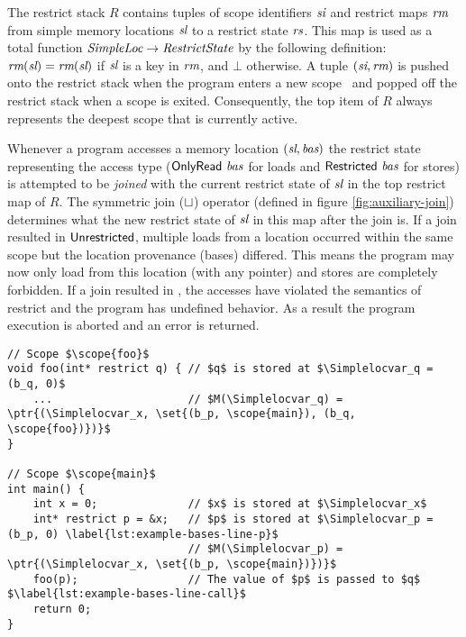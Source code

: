The restrict stack $R$ contains tuples of scope identifiers $\textit{si}$ and restrict maps $\textit{rm}$ from simple memory locations $\textit{sl}$ to 
a restrict state $\textit{rs}$.
This map is used as a total function $\textit{SimpleLoc}\rightarrow \textit{RestrictState}$ by the following definition: 
$\textit{rm}(\textit{sl}) = \textit{rm}(\textit{sl})$ if $\textit{sl}$ is a key in $\textit{rm}$, and $\bot$ otherwise.
A tuple $(\textit{si}, \textit{rm})$ is pushed onto the restrict stack when the program enters a new scope \Scopeidvar \ and
popped off the restrict stack when a scope is exited.
Consequently, the top item of $R$ always represents the deepest scope that is currently active.

Whenever a program accesses a memory location $(\textit{sl}, \textit{bas})$
the restrict state representing the access type ($\mathsf{OnlyRead} \ \textit{bas}$ for loads and $\mathsf{Restricted} \ \textit{bas}$ for stores)
is attempted to be \textit{joined} with the current restrict state of $\textit{sl}$ in the top restrict map of $R$.
The symmetric join ($\mathrel{\sqcup}$) operator (defined in figure \ref{fig:auxiliary-join}) determines what the new restrict state of $\textit{sl}$ in this map after the join is.
If a join resulted in $\mathsf{Unrestricted}$, multiple loads from a location occurred within the same scope but the location provenance (\ie bases) differed.
This means the program may now only load from this location (with any pointer) and stores are completely forbidden.
If a join resulted in \rsub, the accesses have violated the semantics of restrict and the program has undefined behavior.
As a result the program execution is aborted and an error is returned.

\newpage

\begin{code}
\begin{verbatim}
// Scope $\scope{foo}$
void foo(int* restrict q) { // $q$ is stored at $\Simplelocvar_q = (b_q, 0)$
    ...                     // $M(\Simplelocvar_q) = \ptr{(\Simplelocvar_x, \set{(b_p, \scope{main}), (b_q, \scope{foo})})}$
}

// Scope $\scope{main}$
int main() {
    int x = 0;              // $x$ is stored at $\Simplelocvar_x$
    int* restrict p = &x;   // $p$ is stored at $\Simplelocvar_p = (b_p, 0) \label{lst:example-bases-line-p}$
                            // $M(\Simplelocvar_p) = \ptr{(\Simplelocvar_x, \set{(b_p, \scope{main})})}$
    foo(p);                 // The value of $p$ is passed to $q$ $\label{lst:example-bases-line-call}$
    return 0;
}

\end{verbatim}
\caption{Designating and transferring bases provenance}
\label{lst:example-based-on}
\end{code}

